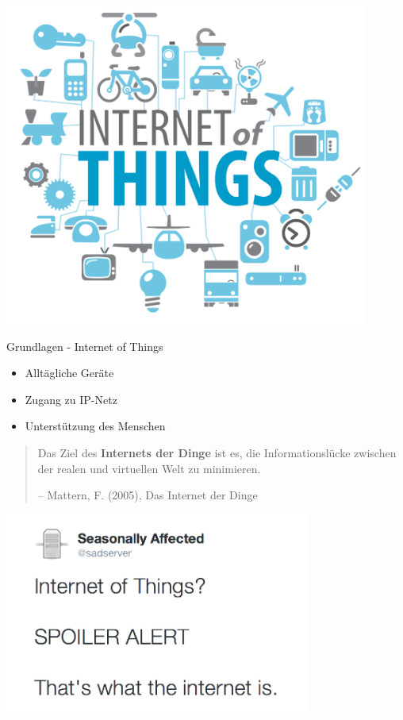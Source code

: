\begin{frame}[fragile]
  \begin{center}
    \includegraphics[width=0.9\textwidth]{images/iot}
    \label{fig:iot}
  \end{center}
\end{frame}

\begin{frame}{Grundlagen - Internet of Things}
  \Large
  \begin{itemize}
    \item Alltägliche Geräte
    \item Zugang zu IP-Netz
    \item Unterstützung des Menschen
  \end{itemize}

  \vspace{0.5cm}

  \begin{quote}
    \normalsize
    Das Ziel des \textbf{Internets der Dinge} ist es, die Informationslücke
    zwischen der realen und virtuellen Welt zu minimieren.
    \begin{flushright}
      \small
      -- Mattern, F. (2005), Das Internet der Dinge
    \end{flushright}
  \end{quote}
\end{frame}

\begin{frame}[fragile]
  \begin{center}
    \includegraphics[width=0.75\textwidth]{images/sadserver1}
    \label{fig:spoiler}
  \end{center}
\end{frame}